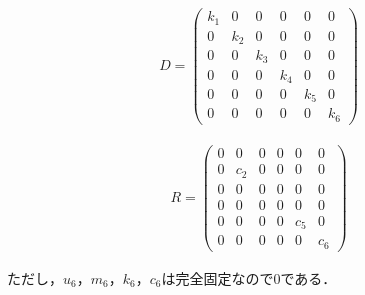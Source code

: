 \begin{eqnarray}
    D =
    \left(\begin{matrix}
        k_1 & 0   & 0   & 0   & 0   & 0   \\
        0   & k_2 & 0   & 0   & 0   & 0   \\
        0   & 0   & k_3 & 0   & 0   & 0   \\
        0   & 0   & 0   & k_4 & 0   & 0   \\
        0   & 0   & 0   & 0   & k_5 & 0   \\
        0   & 0   & 0   & 0   & 0   & k_6
    \end{matrix}\right)
\end{eqnarray}

\begin{eqnarray}
    R = 
    \left(\begin{matrix}
        0   & 0   & 0   & 0   & 0   & 0   \\
        0   & c_2 & 0   & 0   & 0   & 0   \\
        0   & 0   & 0   & 0   & 0   & 0   \\
        0   & 0   & 0   & 0   & 0   & 0   \\
        0   & 0   & 0   & 0   & c_5 & 0   \\
        0   & 0   & 0   & 0   & 0   & c_6
    \end{matrix}\right)
\end{eqnarray}

ただし，$u_6$，$m_6$，$k_6$，$c_6$は完全固定なので$0$である．